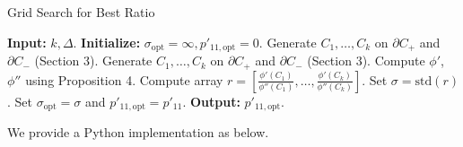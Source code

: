 \documentclass[
  letterpaper,
  numbers=noenddot,
  DIV=11]{scrreprt}
\theoremstyle{plain}
\theoremstyle{definition}
\theoremstyle{plain}
\theoremstyle{remark}
\begin{document}
\begin{algorithm}[H]
    \caption{Grid Search for Best Ratio}
    \label{alg-lfpm}
\begin{algorithmic}[1]
        \State \textbf{Input:} $k, \Delta$.
        \State \textbf{Initialize:} $\sigma_{\text{opt}} = \infty, p'_{11,\text{opt}} = 0$.
        \State Generate $C_1, \dots, C_k$ on $\partial C_+$ and $\partial C_-$ (Section 3).
        \State Generate $C_1, \dots, C_k$ on $\partial C_+$ and $\partial C_-$ (Section 3).
            \State Compute $\phi'$, $\phi''$ using Proposition 4. 
            \State Compute array $r = \left[ \frac{\phi'(C_1)}{\phi''(C_1)}, \dots, \frac{\phi'(C_k)}{\phi''(C_k)} \right]$.
            \State Set $\sigma = \text{std}(r)$.
                \State Set $\sigma_{\text{opt}} = \sigma$ and $p'_{11,\text{opt}} = p'_{11}$.
            \EndIf
        \EndFor
        \State \textbf{Output:} $p'_{11,\text{opt}}$.
    \end{algorithmic}
\end{algorithm}

We provide a Python implementation as below.
\end{document}
